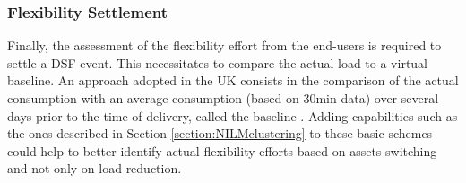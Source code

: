 \documentclass[conference]{IEEEtran}
\begin{document}
\subsubsection{Flexibility Settlement}
Finally, the assessment of the flexibility effort from the end-users is required to settle a DSF event. This necessitates to compare the actual load to a virtual baseline. An approach adopted in the UK  consists in the comparison of  the actual consumption with an average consumption  (based on 30min data) over several days prior to the time of delivery, called the baseline \cite{ESO:BaselineP376}. Adding capabilities such as the ones described in Section \ref{section:NILMclustering} to these basic schemes could help to better identify actual flexibility efforts based on assets switching and not only on load reduction.
%
%
%
%
\end{document}
